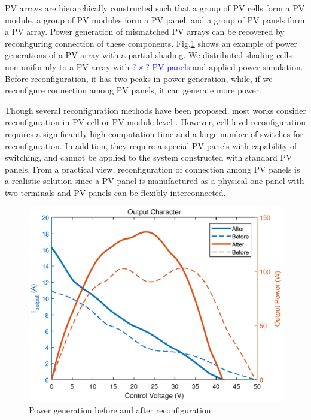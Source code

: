 \documentclass[conference]{IEEEtran}
\begin{document}
PV arrays are hierarchically constructed such that a group of PV cells form a PV module, a group of PV modules form a PV panel, and a group of PV panels form a PV array. Power generation of mismatched PV arrays can be recovered by reconfiguring connection of these components. 
Fig.\ref{compare} shows an example of power generations of a PV array with a partial shading. We distributed shading cells non-uniformly to a PV array with \textcolor{blue}{$? \times ?$ PV panels} and applied power simulation. Before reconfiguration, it has two peaks in power generation, while, if we reconfigure connection among PV panels, it can generate more power. 


Though several reconfiguration methods have been proposed, most works consider reconfiguration in PV cell or PV module level \cite{nguyen2008adaptive,wang2014architecture,storey2013improved,storey2014optimized,udenze2018reconfiguration}. 
However, cell level reconfiguration requires a significantly high computation time and a large number of switches for reconfiguration. In addition, they require a special PV panels with capability of switching, and cannot be applied to the system constructed with standard PV panels. From a practical view, reconfiguration of connection among PV panels is a realistic solution since a PV panel is manufactured as a physical one panel with two terminals and PV panels can be flexibly interconnected. 

\begin{figure}[t]
    \centering
    \includegraphics[width=0.8\linewidth]{fig/compare_new.eps}
    \caption{Power generation before and after reconfiguration}
    \label{compare}
\end{figure}
\end{document}
